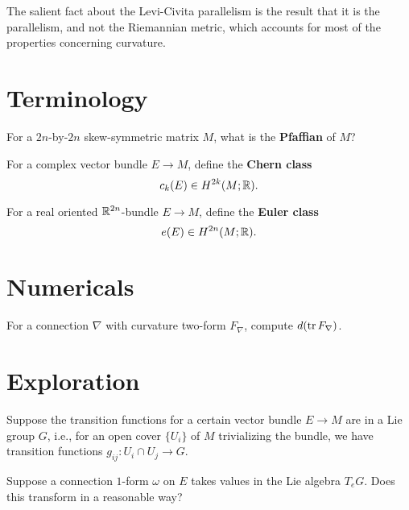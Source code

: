 \documentclass{homework}
\author{Jim Fowler}
\begin{document}
\maketitle

\begin{inspiration} The salient fact about the Levi-Civita parallelism
is the result that it is the parallelism, and not the Riemannian
metric, which accounts for most of the properties concerning
curvature.  
\end{inspiration}

\section{Terminology}

\begin{problem}
  For a $2n$-by-$2n$ skew-symmetric matrix $M$, what is the \textbf{Pfaffian} of $M$?
\end{problem}

\begin{problem}
  For a complex vector bundle $E \to M$, define the \textbf{Chern class}
  \[
    c_k(E) \in H^{2k}(M;\mathbb{R}).
  \]
\end{problem}

\begin{problem}
  For a real oriented $\mathbb{R}^{2n}$-bundle $E \to M$, define the \textbf{Euler class}
  \[
    e(E) \in H^{2n}(M;\mathbb{R}).
    \]
\end{problem}

\section{Numericals}

\begin{problem}
  For a connection $\nabla$ with curvature two-form $F_\nabla$, compute
    $d(\operatorname{tr} F_\nabla)$.
\end{problem}

\section{Exploration}

\begin{problem} Suppose the transition functions for a certain vector
bundle $E \to M$ are in a Lie group $G$, i.e., for an open cover $\{
U_i \}$ of $M$ trivializing the bundle, we have transition functions
$g_{ij} : U_i \cap U_j \to G$.

Suppose a connection $1$-form $\omega$ on $E$ takes values in the
Lie algebra $T_e G$.  Does this transform in a reasonable way?
\end{problem}
\end{document}
